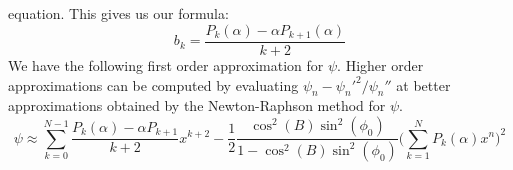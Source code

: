 \documentclass[crop=false,class=book,oneside]{standalone}
\begin{document}
            equation. This gives us our formula:
            \begin{equation*}
                b_{k}=\frac{P_{k}(\alpha)-\alpha{P}_{k+1}(\alpha)}{k+2}
            \end{equation*}
            We have the following first order approximation
            for $\psi$. Higher order approximations can be
            computed by evaluating
            $\psi_{n}-\psi_{n}'^{2}/\psi_{n}''$
            at better approximations obtained by the
            Newton-Raphson method for $\psi$.
            \begin{equation*}
                \psi\approx
                \sum_{k=0}^{N-1}
                \frac{P_{k}(\alpha)-\alpha{P}_{k+1}}{k+2}x^{k+2}
                -\frac{1}{2}
                \frac{\cos^{2}(B)\sin^{2}(\phi_{0})}
                     {1-\cos^{2}(B)\sin^{2}(\phi_{0})}
                \Big(\sum_{k=1}^{N}P_{k}(\alpha)x^{n}\Big)^{2}
            \end{equation*}
\end{document}
